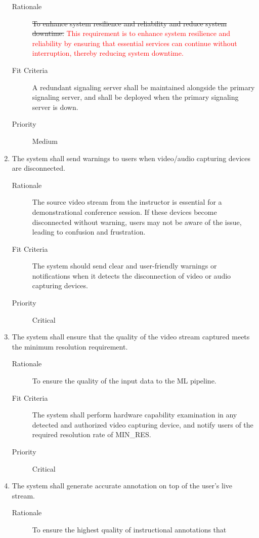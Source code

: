\documentclass{article}
\begin{document}
\begin{enumerate}[label=\textbf{PR\arabic*}]
	\begin{description}
  \item[Rationale] \sout{To enhance system resilience and reliability and reduce system
    downtime.} \textcolor{red}{This requirement is to enhance system resilience 
    and reliability by ensuring that essential services can continue without 
    interruption, thereby reducing system downtime.}
	\item[Fit Criteria] A redundant signaling server shall be maintained alongside
    the primary signaling server, and shall be deployed when the primary
    signaling server is down.
	\item[Priority] Medium
  \end{description}
\item The system shall send warnings to users when video/audio capturing devices
  are disconnected. \label{PR10}
  \begin{description}
  \item[Rationale] The source video stream from the instructor is essential for a
    demonstrational conference session. If these devices become disconnected
    without warning, users may not be aware of the issue, leading to confusion
    and frustration.
	\item[Fit Criteria] The system should send clear and user-friendly warnings or
    notifications when it detects the disconnection of video or audio capturing
    devices.
	\item[Priority] Critical
  \end{description}
\item The system shall ensure that the quality of the video stream captured meets
  the minimum resolution requirement. \label{PR11}
	\begin{description}
  \item[Rationale] To ensure the quality of the input data to the ML pipeline.
	\item[Fit Criteria] The system shall perform hardware capability examination in
    any detected and authorized video capturing device, and notify users of the
    required resolution rate of MIN\_RES.
	\item[Priority] Critical
  \end{description}
\item The system shall generate accurate annotation on top of the user's live
  stream. \label{PR12}
	\begin{description}
  \item[Rationale] To ensure the highest quality of instructional annotations that

\end{description}
\end{enumerate}
\end{document}
